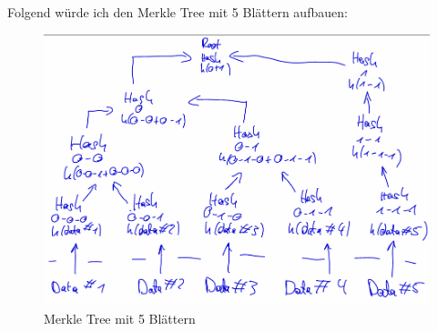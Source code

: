 \documentclass[german]{../uebung}
\begin{document}
\begin{exercise}{5}
    Folgend würde ich den Merkle Tree mit 5 Blättern aufbauen:
    \begin{figure}[h]
        \centering
        \includegraphics*[scale=.5]{MerkleTreeReal.png}
        \caption{Merkle Tree mit 5 Blättern}
    \end{figure}\\
\end{exercise}
\end{document}
